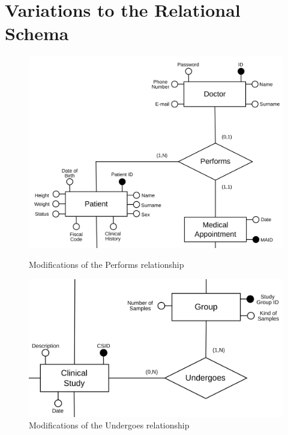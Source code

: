\section{Variations to the Relational Schema}

\begin{figure}[htp!]
\centering
\begin{minipage}{.5\textwidth}
  \centering
  \includegraphics[width=0.725\linewidth]{schemas/er_schema_performs.png}
  \caption{Modifications of the Performs relationship}
  \label{fig:test1}
\end{minipage}%
\begin{minipage}{.5\textwidth}
  \centering
  \includegraphics[width=1\linewidth]{schemas/er_schema_undergoes.png}
  \caption{Modifications of the Undergoes relationship}
  \label{fig:test2}
\end{minipage}
\end{figure}


